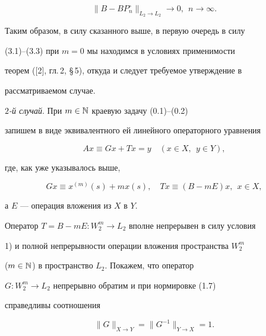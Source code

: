 \begin{equation}


\|B - BP_n^\circ\|_{L_2\to L_2}\to 0,\ \ n\to \infty.


\end{equation}





Таким образом, в силу сказанного выше, в первую очередь в силу


(3.1)--(3.3) при $m=0$ мы находимся в условиях применимости


теорем ([2], гл.\,2, \S\,5), откуда и следует требуемое утверждение в


рассматриваемом случае.





{\it $2$-й случай}. При $m\in \Bbb {N}$ краевую задачу (0.1)--(0.2)


запишем в виде эквивалентного ей линейного операторного уравнения


\begin{equation}


Ax \equiv Gx + Tx = y\quad (x\in X,\ \ y\in Y),


\end{equation}


где, как уже указывалось выше,


$$


Gx \equiv x^{(m)}(s)+mx(s),\quad Tx \equiv (B - mE)x, \ \ x\in X,


$$


а $E$ --- операция вложения из $X$ в $Y$.





Оператор $T = B-mE:W_2^m \to L_2$ вполне непрерывен в силу условия


1) и полной непрерывности операции вложения  пространства $W_2^m$


($m\in \Bbb {N}$) в пространство $L_2$. Покажем, что оператор


$G:W_2^m\to L_2$ непрерывно обратим и при нормировке (1.7)


справедливы соотношения


\begin{equation}


\|G\|_{X\to Y} = \|G^{-1}\|_{Y\to X} = 1.


\end{equation}





